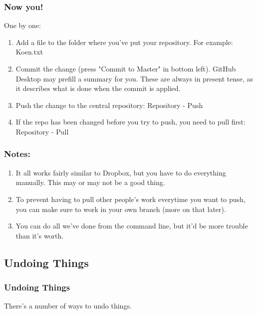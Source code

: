 \documentclass{beamer}
\begin{document}
\begin{frame}
	\frametitle{Now you!}
	One by one:
	\begin{enumerate}
		\item Add a file to the folder where you've put your repository. For example: Koen.txt
		\item Commit the change (press "Commit to Master" in bottom left). GitHub Desktop may prefill a summary for you. 
		  	These are always in present tense, as it describes what is done when the commit is applied.
		\item Push the change to the central repository: Repository - Push
		\item If the repo has been changed before you try to push, you need to pull first:  Repository - Pull 
	\end{enumerate}
\end{frame}

\begin{frame}
	\frametitle{Notes:}
	\begin{enumerate}
		\item It all works fairly similar to Dropbox, but you have to do everything manually. This may or may not be a good thing.
		\item To prevent having to pull other people's work everytime you want to push, you can make sure to work in your own branch (more on that later).
		\item You can do all we've done from the command line, but it'd be more trouble than it's worth.
	\end{enumerate}
\end{frame}

\subsection{Undoing Things}

\begin{frame}
\frametitle{Undoing Things}
There's a number of ways to undo things.
\end{frame}
\end{document}
